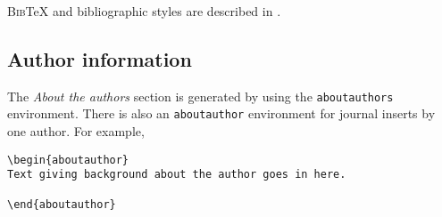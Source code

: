 \noindent
\textsc{Bib}{\TeX}{} and bibliographic styles are described in
\citet*{latexcompanion}.

\subsection{Author information}

The {\sl About the authors\/} section is generated by using the
\texttt{aboutauthors} environment.  There is also an \texttt{aboutauthor}
environment for journal inserts by one author.  For example,

\begin{stverbatim}
\begin{verbatim}
\begin{aboutauthor}
Text giving background about the author goes in here.

\end{aboutauthor}
\end{verbatim}
\end{stverbatim}

\endinput
